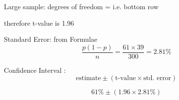 \documentclass[a4paper,12pt]{article}
\begin{document}
                      Large sample:  degrees of freedom =  i.e. bottom row
 
                      therefore t-value is 1.96                   
 
 
Standard Error:  from Formulae   
\[  \frac{p(1-p)}{n}      = \frac{61 \times 39}{300}        = 2.81\%\]
 
 
Confidence Interval : 
\[\mbox{estimate} \pm (\mbox{t-value} \times \mbox{std. error})\]
 
\[  61\% \pm (1.96 \times 2.81\%) \]
 


\newpage
\end{document}
